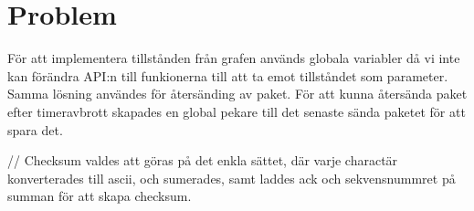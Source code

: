 \section{Problem}
För att implementera tillstånden från grafen används globala variabler då vi inte kan förändra API:n till funkionerna till att ta emot tillståndet som parameter.
Samma lösning användes för återsänding av paket. För att kunna återsända paket efter timeravbrott skapades en global pekare till det senaste sända paketet för att spara det.

// Checksum valdes att göras på det enkla sättet, där varje charactär konverterades till
ascii, och sumerades, samt laddes ack och sekvensnummret på summan för att skapa
checksum. 
